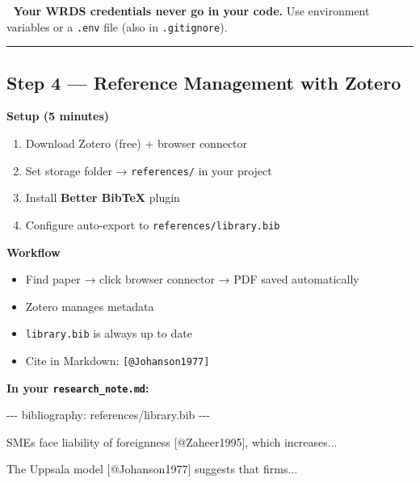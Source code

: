 \documentclass[
  letterpaper,
  DIV=11,
  numbers=noendperiod]{scrartcl}
\newenvironment{Shaded}{\begin{snugshade}}{\end{snugshade}}
\newcommand{\AnnotationTok}[1]{\textcolor[rgb]{0.37,0.37,0.37}{#1}}
\newcommand{\CommentTok}[1]{\textcolor[rgb]{0.37,0.37,0.37}{#1}}
\newcommand{\NormalTok}[1]{\textcolor[rgb]{0.00,0.23,0.31}{#1}}
\newcommand{\OtherTok}[1]{\textcolor[rgb]{0.00,0.23,0.31}{#1}}
\providecommand{\tightlist}{%
  \setlength{\itemsep}{0pt}\setlength{\parskip}{0pt}}\usepackage{longtable,booktabs,array}
\begin{document}
📌 \textbf{Your WRDS credentials never go in your code.} Use environment
variables or a \texttt{.env} file (also in \texttt{.gitignore}).

\begin{center}\rule{0.5\linewidth}{0.5pt}\end{center}

\subsection{Step 4 --- Reference Management with
Zotero}\label{step-4-reference-management-with-zotero}

\textbf{Setup (5 minutes)}

\begin{enumerate}
\def\labelenumi{\arabic{enumi}.}
\tightlist
\item
  Download Zotero (free) + browser connector
\item
  Set storage folder → \texttt{references/} in your project
\item
  Install \textbf{Better BibTeX} plugin
\item
  Configure auto-export to \texttt{references/library.bib}
\end{enumerate}

\textbf{Workflow}

\begin{itemize}
\tightlist
\item
  Find paper → click browser connector → PDF saved automatically
\item
  Zotero manages metadata
\item
  \texttt{library.bib} is always up to date
\item
  Cite in Markdown: \texttt{{[}@Johanson1977{]}}
\end{itemize}

\textbf{In your \texttt{research\_note.md}:}

\begin{Shaded}
\begin{Highlighting}[]
\CommentTok{{-}{-}{-}}
\AnnotationTok{bibliography:}\CommentTok{ references/library.bib}
\CommentTok{{-}{-}{-}}

\NormalTok{SMEs face liability of foreignness}
\CommentTok{[}\OtherTok{@Zaheer1995}\CommentTok{]}\NormalTok{, which increases...}

\NormalTok{The Uppsala model }\CommentTok{[}\OtherTok{@Johanson1977}\CommentTok{]}
\NormalTok{suggests that firms...}
\end{Highlighting}
\end{Shaded}
\end{document}
